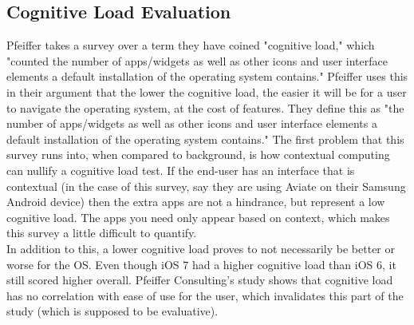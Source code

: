 \documentclass[11pt]{article}
\begin{document}
\subsection{Cognitive Load Evaluation}
Pfeiffer takes a survey over a term they have coined "cognitive load," which "counted
the number of apps/widgets as well as other icons and user interface elements a default installation of the operating system contains." \cite{Pfeiffer} Pfeiffer uses this in their argument that the lower the cognitive load, the easier it will be for a user to navigate the operating system, at the cost of features. They define this as "the number of apps/widgets as well as other icons and user interface elements a default installation of the operating system contains." \cite{Pfeiffer} The first problem that this survey runs into, when compared to background, is how contextual computing can nullify a cognitive load test. If the end-user has an interface that is contextual (in the case of this survey, say they are using Aviate on their Samsung Android device) then the extra apps are not a hindrance, but represent a low cognitive load. The apps you need only appear based on context, which makes this survey a little difficult to quantify. \\
\indent In addition to this, a lower cognitive load proves to not necessarily be better or worse for the OS. Even though iOS 7 had a higher cognitive load than iOS 6, it still scored higher overall. Pfeiffer Consulting's study shows that cognitive load has no correlation with ease of use for the user, which invalidates this part of the study (which is supposed to be evaluative).
\end{document}
